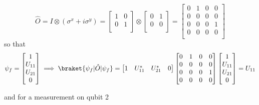 \begin{equation}
    \hat{O}=I \otimes (\sigma^{x} + i\sigma^{y}) =
    \begin{bmatrix}
        1 & 0\\
        0 & 1\\
    \end{bmatrix}
    \otimes
    \begin{bmatrix}
        0 & 1\\
        0 & 0\\
    \end{bmatrix}=
    \begin{bmatrix}
        0 & 1 & 0 & 0\\
        0 & 0 & 0 & 0\\
        0 & 0 & 0 & 1\\
        0 & 0 & 0 & 0\\
    \end{bmatrix}
\end{equation}
so that
\begin{equation}
    \psi_{f}=
    \begin{bmatrix}
        1 \\
        U_{11} \\
        U_{21} \\
        0 \\
    \end{bmatrix}
    \implies
    \braket{\psi_{f}|\hat{O}|\psi_{f}} =
    \begin{bmatrix}
        1 & U_{11}^{*} & U_{21}^{*} & 0
    \end{bmatrix}
    \begin{bmatrix}
        0 & 1 & 0 & 0\\
        0 & 0 & 0 & 0\\
        0 & 0 & 0 & 1\\
        0 & 0 & 0 & 0\\
    \end{bmatrix}
    \begin{bmatrix}
        1 \\
        U_{11} \\
        U_{21} \\
        0 \\
    \end{bmatrix}
    = U_{11}
\end{equation}

and for a measurement on qubit 2


